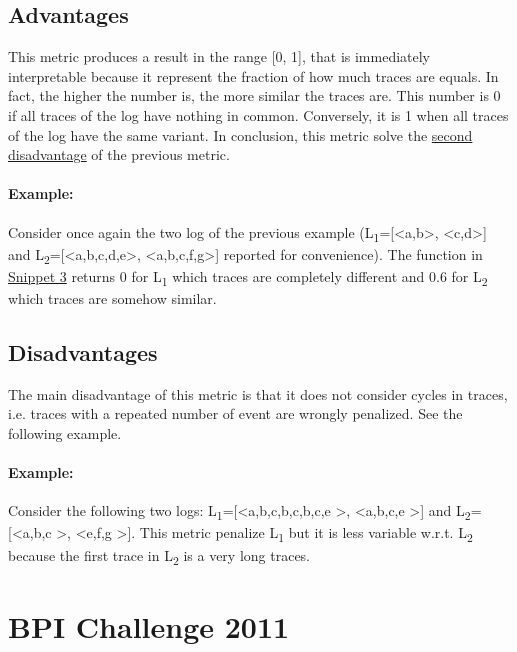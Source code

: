 \documentclass[12pt]{article}
\begin{document}
\subsection*{Advantages}

This metric produces a result in the range [0, 1], that is immediately interpretable because it represent the fraction of how much traces are equals. In fact, the higher the number is, the
more similar the traces are. This number is 0 if all traces of the log have nothing in common. Conversely, it is 1 when all traces of the log have the same variant. In conclusion, this metric solve the \hyperref[ref:cons2]{second disadvantage} of the previous metric.

\paragraph*{Example:} Consider once again the two log of the previous example (L\textsubscript{1}=[\textless a,b\textgreater, \textless c,d\textgreater] and L\textsubscript{2}=[\textless a,b,c,d,e\textgreater, \textless a,b,c,f,g\textgreater] reported for convenience). The function in \hyperref[code:code3]{Snippet 3} returns 0 for L\textsubscript{1} which traces are completely different and 0.6 for L\textsubscript{2} which traces are somehow similar.

\subsection*{Disadvantages}

The main disadvantage of this metric is that it does not consider cycles in traces, i.e. traces with a repeated number of event are wrongly penalized. See the following example.

\paragraph*{Example:} Consider the following two logs: L\textsubscript{1}=[\textless a,b,c,b,c,b,c,e \textgreater, \textless a,b,c,e \textgreater] and L\textsubscript{2}=[\textless a,b,c \textgreater, \textless e,f,g \textgreater]. This metric penalize L\textsubscript{1} but it is less variable w.r.t. L\textsubscript{2} because the first trace in L\textsubscript{2} is a very long traces.

\section*{BPI Challenge 2011}\label{section:results}
\end{document}
